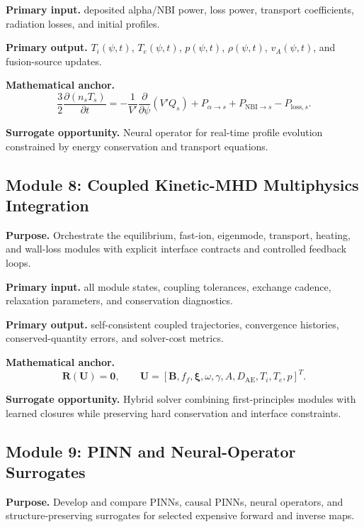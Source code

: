 \documentclass[11pt]{article}
\begin{document}
\textbf{Primary input.} deposited alpha/NBI power, loss power, transport coefficients, radiation losses, and initial profiles.

\textbf{Primary output.} $T_i(\psi,t)$, $T_e(\psi,t)$, $p(\psi,t)$, $\rho(\psi,t)$, $v_A(\psi,t)$, and fusion-source updates.

\textbf{Mathematical anchor.}
\begin{equation}
\frac{3}{2}\frac{\partial(n_sT_s)}{\partial t}=-\frac{1}{V\prime}\frac{\partial}{\partial\psi}\left(V\prime Q_s\right)+P_{\alpha\rightarrow s}+P_{\mathrm{NBI}\rightarrow s}-P_{\mathrm{loss},s}.
\end{equation}

\textbf{Surrogate opportunity.} Neural operator for real-time profile evolution constrained by energy conservation and transport equations.


\subsection{Module 8: Coupled Kinetic-MHD Multiphysics Integration}
\textbf{Purpose.} Orchestrate the equilibrium, fast-ion, eigenmode, transport, heating, and wall-loss modules with explicit interface contracts and controlled feedback loops.

\textbf{Primary input.} all module states, coupling tolerances, exchange cadence, relaxation parameters, and conservation diagnostics.

\textbf{Primary output.} self-consistent coupled trajectories, convergence histories, conserved-quantity errors, and solver-cost metrics.

\textbf{Mathematical anchor.}
\begin{equation}
\mathbf R(\mathbf U)=\mathbf 0,\qquad \mathbf U=[\mathbf B,f_f,\boldsymbol\xi,\omega,\gamma,A,D_{\mathrm{AE}},T_i,T_e,p]^T.
\end{equation}

\textbf{Surrogate opportunity.} Hybrid solver combining first-principles modules with learned closures while preserving hard conservation and interface constraints.


\subsection{Module 9: PINN and Neural-Operator Surrogates}
\textbf{Purpose.} Develop and compare PINNs, causal PINNs, neural operators, and structure-preserving surrogates for selected expensive forward and inverse maps.
\end{document}
